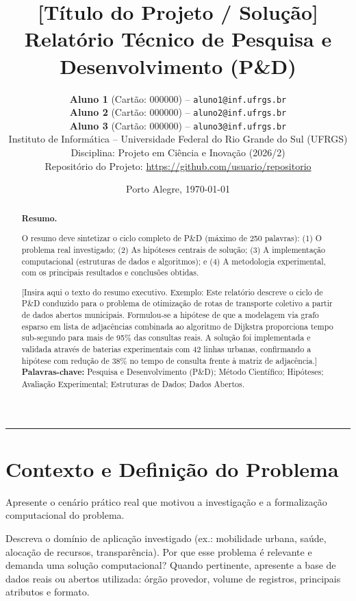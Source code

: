 \documentclass[11pt,a4paper]{article}
\title{
    \vspace{-1.0cm}
    \textbf{\Large [Título do Projeto / Solução]}\\[0.3cm]
    \large Relatório Técnico de Pesquisa e Desenvolvimento (P\&D)
}
\author{
    \textbf{Aluno 1} (Cartão: 000000) -- \texttt{aluno1@inf.ufrgs.br}\\
    \textbf{Aluno 2} (Cartão: 000000) -- \texttt{aluno2@inf.ufrgs.br}\\
    \textbf{Aluno 3} (Cartão: 000000) -- \texttt{aluno3@inf.ufrgs.br}\\[0.3cm]
    \normalsize Instituto de Informática -- Universidade Federal do Rio Grande do Sul (UFRGS)\\
    \normalsize Disciplina: Projeto em Ciência e Inovação (2026/2)\\
    \small Repositório do Projeto: \url{https://github.com/usuario/repositorio}
}
\date{Porto Alegre, \today}
\begin{document}
\maketitle
\thispagestyle{fancy}

\begin{abstract}
\noindent
\textbf{Resumo.} 
\begin{instrucao}
O resumo deve sintetizar o ciclo completo de P\&D (máximo de 250 palavras): (1) O problema real investigado; (2) As hipóteses centrais de solução; (3) A implementação computacional (estruturas de dados e algoritmos); e (4) A metodologia experimental, com os principais resultados e conclusões obtidas.
\end{instrucao}
[Insira aqui o texto do resumo executivo. Exemplo: Este relatório descreve o ciclo de P\&D conduzido para o problema de otimização de rotas de transporte coletivo a partir de dados abertos municipais. Formulou-se a hipótese de que a modelagem via grafo esparso em lista de adjacências combinada ao algoritmo de Dijkstra proporciona tempo sub-segundo para mais de 95\% das consultas reais. A solução foi implementada e validada através de baterias experimentais com 42 linhas urbanas, confirmando a hipótese com redução de 38\% no tempo de consulta frente à matriz de adjacência.]
\\[0.3cm]
\textbf{Palavras-chave:} Pesquisa e Desenvolvimento (P\&D); Método Científico; Hipóteses; Avaliação Experimental; Estruturas de Dados; Dados Abertos.
\end{abstract}

\vspace{0.3cm}
\hrule
\vspace{0.4cm}

\section{Contexto e Definição do Problema}

\begin{instrucao}
Apresente o cenário prático real que motivou a investigação e a formalização computacional do problema.
\end{instrucao}

Descreva o domínio de aplicação investigado (ex.: mobilidade urbana, saúde, alocação de recursos, transparência). Por que esse problema é relevante e demanda uma solução computacional? Quando pertinente, apresente a base de dados reais ou abertos utilizada: órgão provedor, volume de registros, principais atributos e formato.
\end{document}
